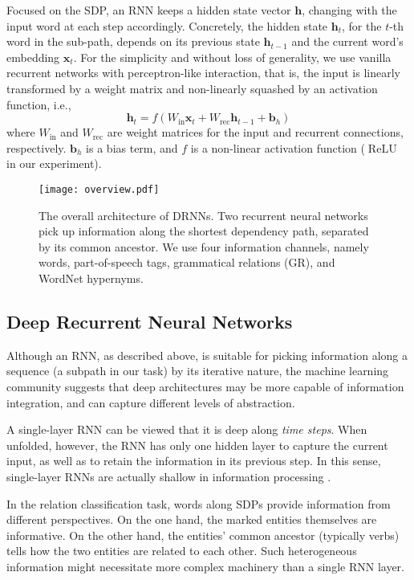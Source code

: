 \documentclass[11pt]{article}
\begin{document}
Focused on the SDP, an RNN keeps a hidden state vector $\bm h$, changing with the input word at each step accordingly.
Concretely, the hidden state $\bm h_t$, for the $t$-th word in the sub-path, depends on its previous state $\bm h_{t-1}$ and the current word's embedding $\bm x_t$. For the simplicity and without loss of generality, we use vanilla recurrent networks with perceptron-like interaction, that is, the input is linearly transformed by a weight matrix and non-linearly squashed by an activation function, i.e.,
\begin{equation}
\bm h_t=f(W_\text{in}\bm x_t+W_\text{rec}\bm h_{t-1}+\bm b_h)\label{eqn:shallow}
\end{equation}
where $W_\text{in}$ and $W_\text{rec}$ are weight matrices for the input and recurrent connections, respectively.
$\bm b_h$ is a bias term, and $f$ is a non-linear activation function ($\operatorname{ReLU}$ in our experiment).
\begin{figure*}
\centering
\bigskip
\texttt{[image: overview.pdf]}
\caption{The overall architecture of DRNNs.
Two recurrent neural networks pick up information along the shortest dependency path, separated by its common ancestor. We use four information channels, namely words, part-of-speech tags, grammatical relations (GR), and WordNet hypernyms.}\label{fArchitecture}
\end{figure*}


\subsection{Deep Recurrent Neural Networks}\label{ssDeepRNN}

Although an RNN, as described above, is suitable for picking information along a sequence (a subpath in our task) by its iterative nature, the machine learning community suggests that deep architectures may be more capable of information integration, and can capture different levels of abstraction.

A single-layer RNN can be viewed that it is deep along \textit{time steps}. When unfolded, however, the RNN has only one hidden layer to capture the current input, as well as to retain the information in its previous step. In this sense, single-layer RNNs are actually shallow in information processing \cite{TrainDRNN,OpinionDRNN}.

In the relation classification task, words along SDPs provide information from different perspectives. On the one hand, the marked entities themselves are informative. On the other hand, the entities' common ancestor (typically verbs) tells how the two entities are related to each other. Such heterogeneous information might necessitate more complex machinery than a single RNN layer.
\end{document}
